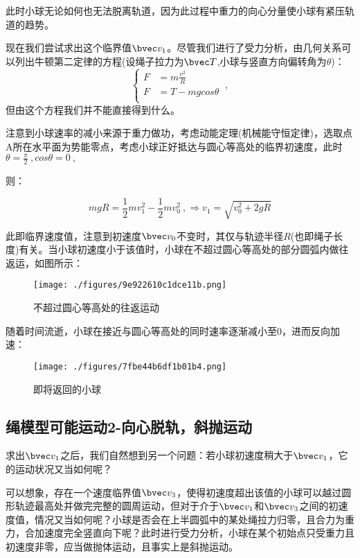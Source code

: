 此时小球无论如何也无法脱离轨道，因为此过程中重力的向心分量使小球有紧压轨道的趋势。

现在我们尝试求出这个临界值$\bvec v_1$。尽管我们进行了受力分析，由几何关系可以列出牛顿第二定律的方程(设绳子拉力为$\bvec T$,小球与竖直方向偏转角为$\theta$)：
$$
\left \{
\begin{aligned}
F&=m\frac{v^2}{R}\\
F&=T-mg cos \theta \\
\end{aligned}
\right.
~,
$$
但由这个方程我们并不能直接得到什么。

注意到小球速率的减小来源于重力做功，考虑动能定理(机械能守恒定律)，选取点A所在水平面为势能零点，考虑小球正好抵达与圆心等高处的临界初速度，此时$\theta=\frac{\pi }{2}~, cos \theta=0~,$

则：

\begin{equation}
mgR = \frac12 mv_1^2 - \frac12 mv_0^2~,
\Rightarrow 
v_1=\sqrt{v_0^2+2gR}
\end{equation}

此即临界速度值，注意到初速度$\bvec v_0$不变时，其仅与轨迹半径$R$(也即绳子长度)有关。当小球初速度小于该值时，小球在不超过圆心等高处的部分圆弧内做往返运，如图所示：
\begin{figure}[ht]
\centering
\texttt{[image: ./figures/9e922610c1dce11b.png]}
\caption{不超过圆心等高处的往返运动} \label{fig_CirVer_2}
\end{figure}

随着时间流逝，小球在接近与圆心等高处的同时速率逐渐减小至0，进而反向加速：

\begin{figure}[ht]
\centering
\texttt{[image: ./figures/7fbe44b6df1b01b4.png]}
\caption{即将返回的小球} \label{fig_CirVer_1}
\end{figure}

\subsection{绳模型可能运动2-向心脱轨，斜抛运动}
求出$\bvec v_1$之后，我们自然想到另一个问题：若小球初速度稍大于$\bvec v_1$，它的运动状况又当如何呢？

可以想象，存在一个速度临界值$\bvec v_3$，使得初速度超出该值的小球可以越过圆形轨迹最高处并做完完整的圆周运动，但对于介于$\bvec v_1$和$\bvec v_3$之间的初速度值，情况又当如何呢？小球是否会在上半圆弧中的某处绳拉力归零，且合力为重力，合加速度完全竖直向下呢？此时进行受力分析，小球在某个初始点只受重力且初速度非零，应当做抛体运动，且事实上是斜抛运动。

